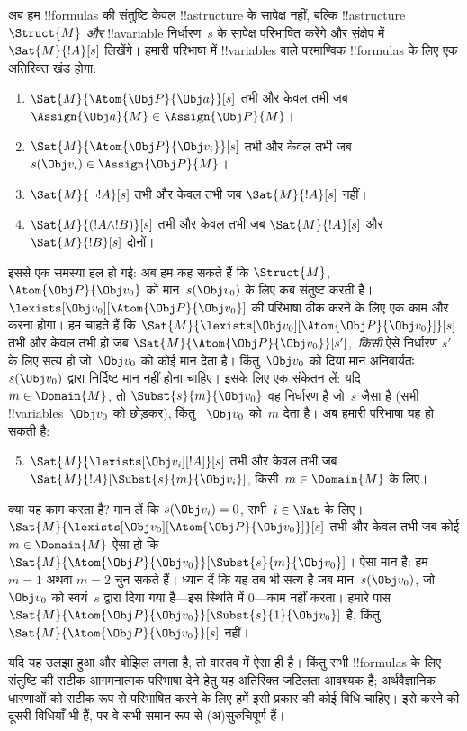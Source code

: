 \documentclass[../../../include/open-logic-section]{subfiles}
\begin{document}
अब हम !!{formula}s की संतुष्टि केवल !!a{structure} के सापेक्ष नहीं, बल्कि
!!a{structure}~$\Struct{M}$ \emph{और} !!a{variable} निर्धारण~$s$ के
सापेक्ष परिभाषित करेंगे और संक्षेप में $\Sat{M}{!A}[s]$ लिखेंगे। हमारी
परिभाषा में !!{variable}s वाले परमाण्विक !!{formula}s के लिए एक अतिरिक्त
खंड होगा:
\begin{enumerate}
  \item $\Sat{M}{\Atom{\Obj P}{\Obj a}}[s]$ तभी और केवल तभी जब
  $\Assign{\Obj a}{M} \in \Assign{\Obj P}{M}$।
  \item $\Sat{M}{\Atom{\Obj P}{\Obj v_i}}[s]$ तभी और केवल तभी जब
  $s(\Obj v_i) \in \Assign{\Obj P}{M}$।
  \item $\Sat{M}{\lnot !A}[s]$ तभी और केवल तभी जब $\Sat{M}{!A}[s]$ नहीं।
  \item $\Sat{M}{(!A \land !B)}[s]$ तभी और केवल तभी जब $\Sat{M}{!A}[s]$
  और $\Sat{M}{!B}[s]$ दोनों।
\end{enumerate}
इससे एक समस्या हल हो गई: अब हम कह सकते हैं कि $\Struct{M}$,
$\Atom{\Obj P}{\Obj v_0}$ को मान~$s(\Obj v_0)$ के लिए कब संतुष्ट करती है।
$\lexists[\Obj v_0][\Atom{\Obj P}{\Obj
v_0}]$ की परिभाषा ठीक करने के लिए एक काम और करना होगा। हम चाहते हैं कि
$\Sat{M}{\lexists[\Obj v_0][\Atom{\Obj P}{\Obj v_0}]}[s]$ तभी और केवल तभी
हो जब $\Sat{M}{\Atom{\Obj P}{\Obj v_0}}[s']$,~\emph{किसी} ऐसे निर्धारण
$s'$ के लिए सत्य हो जो~$\Obj v_0$ को कोई मान देता है। किंतु~$\Obj v_0$ को
दिया मान अनिवार्यतः $s(\Obj v_0)$ द्वारा निर्दिष्ट मान नहीं होना चाहिए। इसके
लिए एक संकेतन लें: यदि $m \in \Domain{M}$, तो $\Subst{s}{m}{\Obj v_0}$ वह
निर्धारण है जो~$s$ जैसा है (सभी !!{variable}s~$\Obj v_0$ को छोड़कर), किंतु
~$\Obj v_0$ को~$m$ देता है। अब हमारी परिभाषा यह हो सकती है:
\begin{enumerate}\setcounter{enumi}{4}
  \item $\Sat{M}{\lexists[\Obj v_i][!A]}[s]$ तभी और केवल तभी जब
  $\Sat{M}{!A}[\Subst{s}{m}{\Obj v_i}]$, किसी~$m \in \Domain{M}$ के लिए।
\end{enumerate}
क्या यह काम करता है? मान लें कि $s(\Obj v_i) = 0$, सभी~$i \in
\Nat$ के लिए। $\Sat{M}{\lexists[\Obj v_0][\Atom{\Obj P}{\Obj v_0}]}[s]$
तभी और केवल तभी जब कोई $m \in \Domain{M}$ ऐसा हो कि
$\Sat{M}{\Atom{\Obj P}{\Obj
v_0}}[\Subst{s}{m}{\Obj v_0}]$। ऐसा मान है: हम $m = 1$ अथवा $m = 2$ चुन
सकते हैं। ध्यान दें कि यह तब भी सत्य है जब मान~$s(\Obj v_0)$, जो~$\Obj v_0$
को स्वयं~$s$ द्वारा दिया गया है---इस स्थिति में $0$---काम नहीं करता। हमारे
पास $\Sat{M}{\Atom{\Obj P}{\Obj v_0}}[\Subst{s}{1}{\Obj
v_0}]$ है, किंतु $\Sat{M}{\Atom{\Obj P}{\Obj v_0}}[s]$ नहीं।

यदि यह उलझा हुआ और बोझिल लगता है, तो वास्तव में ऐसा ही है। किंतु सभी
!!{formula}s के लिए संतुष्टि की सटीक आगमनात्मक परिभाषा देने हेतु यह अतिरिक्त
जटिलता आवश्यक है; अर्थवैज्ञानिक धारणाओं को सटीक रूप से परिभाषित करने के लिए
हमें इसी प्रकार की कोई विधि चाहिए। इसे करने की दूसरी विधियाँ भी हैं, पर वे
सभी समान रूप से (अ)सुरुचिपूर्ण हैं।
\end{document}
